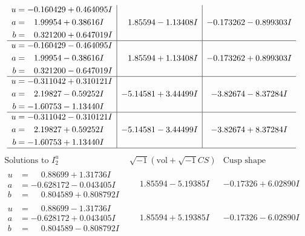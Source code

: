 \documentclass[1p]{elsarticle_modified}
\theoremstyle{definition}
\newcommand{\I}{\sqrt{-1}}
\begin{document}
$$\begin{array}{c|c|c}
\begin{aligned}
u &= -0.160429 + 0.464095 I \\
a &= \phantom{-}1.99954 + 0.38616 I \\
b &= \phantom{-}0.321200 + 0.647019 I\end{aligned}
 & \phantom{-}1.85594 - 1.13408 I & -0.173262 - 0.899303 I \\ \hline\begin{aligned}
u &= -0.160429 - 0.464095 I \\
a &= \phantom{-}1.99954 - 0.38616 I \\
b &= \phantom{-}0.321200 - 0.647019 I\end{aligned}
 & \phantom{-}1.85594 + 1.13408 I & -0.173262 + 0.899303 I \\ \hline\begin{aligned}
u &= -0.311042 + 0.310121 I \\
a &= \phantom{-}2.19827 - 0.59252 I \\
b &= -1.60753 - 1.13440 I\end{aligned}
 & -5.14581 + 3.44499 I & -3.82674 - 8.37284 I \\ \hline\begin{aligned}
u &= -0.311042 - 0.310121 I \\
a &= \phantom{-}2.19827 + 0.59252 I \\
b &= -1.60753 + 1.13440 I\end{aligned}
 & -5.14581 - 3.44499 I & -3.82674 + 8.37284 I\\
 \hline 
 \end{array}$$\newpage$$\begin{array}{c|c|c}  
\text{Solutions to }I^u_{2}& \I (\text{vol} + \sqrt{-1}CS) & \text{Cusp shape}\\
 \hline 
\begin{aligned}
u &= \phantom{-}0.88699 + 1.31736 I \\
a &= -0.628172 - 0.043405 I \\
b &= \phantom{-}0.804589 + 0.808792 I\end{aligned}
 & \phantom{-}1.85594 - 5.19385 I & -0.17326 + 6.02890 I \\ \hline\begin{aligned}
u &= \phantom{-}0.88699 - 1.31736 I \\
a &= -0.628172 + 0.043405 I \\
b &= \phantom{-}0.804589 - 0.808792 I\end{aligned}
 & \phantom{-}1.85594 + 5.19385 I & -0.17326 - 6.02890 I \\ \hline\begin{aligned}

\end{aligned}
\end{array}$$
\end{document}
